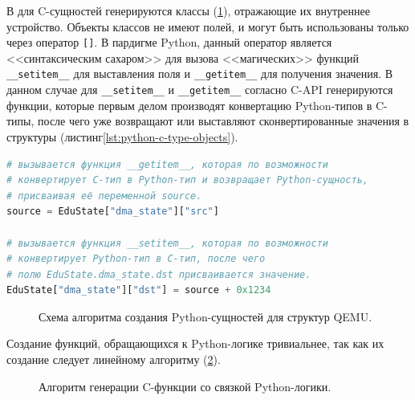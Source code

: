 В {\mylanguage} для C-сущностей генерируются классы (\cref{fig:py-api-compilation}), отражающие их внутреннее устройство.
Объекты классов не имеют полей, и могут быть использованы только через оператор \texttt{[]}.
В пардигме Python, данный оператор является <<синтаксическим сахаром>> для вызова <<магических>>
функций \texttt{\_\_setitem\_\_} для выставления поля и \texttt{\_\_getitem\_\_} для получения значения.
В данном случае для \texttt{\_\_setitem\_\_} и \texttt{\_\_getitem\_\_} согласно C-API \cite{python-c-type-objects}
генерируются функции, которые первым делом производят конвертацию Python-типов в C-типы,
после чего уже возвращают или выставляют сконвертированные значения в структуры (листинг\cref{lst:python-c-type-objects}).

\begin{lstlisting}[caption={Пример доступа к элементу структуры из Python.},
                   captionpos=b,
                   language=python]
# вызывается функция __getitem__, которая по возможности
# конвертирует C-тип в Python-тип и возвращает Python-сущность,
# присваивая её переменной source.
source = EduState["dma_state"]["src"]

# вызывается функция __setitem__, которая по возможности
# конвертирует Python-тип в C-тип, после чего
# полю EduState.dma_state.dst присваивается значение.
EduState["dma_state"]["dst"] = source + 0x1234
\end{lstlisting}\label{lst:python-c-type-objects}

\begin{figure}[!htbp]
    \centering
    \hspace*{-11cm}
    \scalebox{0.8}{
        \begin{minipage}{10cm}
            
        \end{minipage}
    }
    \caption{Схема алгоритма создания Python-сущностей для структур QEMU.}\label{fig:py-api-compilation}
\end{figure}

Создание функций, обращающихся к Python-логике тривиальнее, так как их создание следует
линейному алгоритму (\cref{fig:py-api-func-gen-algo-compilation}).

\begin{figure}[!htbp]
    \centering
    
    \caption{Алгоритм генерации C-функции со связкой Python-логики.}\label{fig:py-api-func-gen-algo-compilation}
\end{figure}

